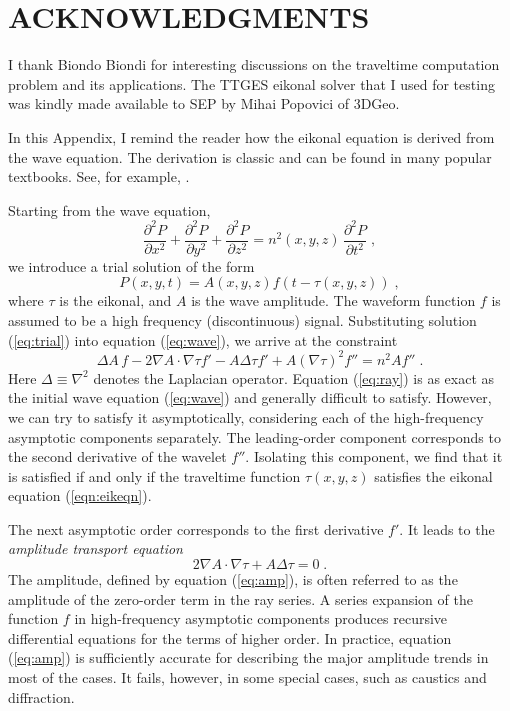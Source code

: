 \section{ACKNOWLEDGMENTS}
I thank Biondo Biondi for interesting discussions on the traveltime
computation problem and its applications. The TTGES eikonal solver
that I used for testing was kindly made available to SEP by Mihai
Popovici of 3DGeo.





In this Appendix, I remind the reader how the eikonal equation is
derived from the wave equation. The derivation is classic and can be
found in many popular textbooks. See, for example, \cite[]{cherv}.
\par
Starting from the wave equation,
\begin{equation}
  \label{eq:wave}
  \frac{\partial^2 P}{\partial x^2} +
  \frac{\partial^2 P}{\partial y^2} +
  \frac{\partial^2 P}{\partial z^2} =
  n^2 (x,y,z)\,\frac{\partial^2 P}{\partial t^2}\;,
\end{equation}
we introduce a trial solution of the form
\begin{equation}
  \label{eq:trial}
  P (x,y,t) = A (x,y,z) f (t - \tau (x,y,z))\;,
\end{equation}
where $\tau$ is the eikonal, and $A$ is the wave amplitude. The
waveform function $f$ is assumed to be a high frequency
(discontinuous) signal. Substituting solution (\ref{eq:trial}) into
equation (\ref{eq:wave}), we arrive at the constraint
\begin{equation}
  \label{eq:ray}
  \Delta A \, f - 2 \nabla A \cdot \nabla \tau f' -
  A \Delta \tau f '  + A \left(\nabla \tau\right)^2 f'' =
  n^2 A f''\;.
\end{equation}
Here $\Delta \equiv \nabla^2$ denotes the Laplacian operator.
Equation (\ref{eq:ray}) is as exact as the initial wave equation
(\ref{eq:wave}) and generally difficult to satisfy. However, we can
try to satisfy it asymptotically, considering each of the
high-frequency asymptotic components separately. The leading-order
component corresponds to the second derivative of the wavelet $f''$.
Isolating this component, we find that it is satisfied if and only if
the traveltime function $\tau (x,y,z)$ satisfies the eikonal equation
(\ref{eqn:eikeqn}).
\par
The next asymptotic order corresponds to the first derivative $f'$. It
leads to the \emph{amplitude transport equation}
\begin{equation}
  \label{eq:amp}
2 \nabla A \cdot \nabla \tau + A \Delta \tau = 0\;.
\end{equation}
The amplitude, defined by equation (\ref{eq:amp}), is often referred
to as the amplitude of the zero-order term in the ray series. A series
expansion of the function $f$ in high-frequency asymptotic components
produces recursive differential equations for the terms of higher
order. In practice, equation (\ref{eq:amp}) is sufficiently accurate
for describing the major amplitude trends in most of the cases. It
fails, however, in some special cases, such as caustics and diffraction.

